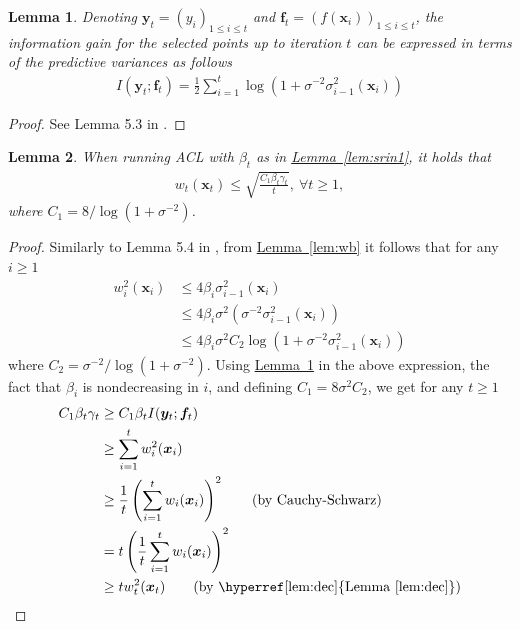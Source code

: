 \documentclass{article}
\def\*#1{\bm{#1}}
\newcommand{\lemmaref}[1]{\hyperref[#1]{\mbox{Lemma~\ref*{#1}}}}
\newtheorem{lemma}{Lemma}
\newcommand{\acl}{\textsf{ACL}\xspace}
\begin{document}
\begin{lemma}
\label{lem:ig}
Denoting $\*y_t = (y_i)_{1\leq i\leq t}$ and
$\*f_t = (f(\*x_i))_{1\leq i\leq t}$,
the information gain for the selected points up to iteration $t$ can be
expressed in terms of the predictive variances as follows
\begin{align*}
I(\*y_t; \*f_t) = \frac{1}{2}\sum_{i=1}^t \log(1 + \sigma^{-2}\sigma_{i-1}^2(\*x_i))
\end{align*}
\end{lemma}
\begin{proof}
See Lemma 5.3 in \cite{srinivas2010}.
\end{proof}

\begin{lemma}
When running \acl with $\beta_t$ as in \lemmaref{lem:srin1}, it holds that
\begin{align*}
w_t(\*x_t) \leq \sqrt{\frac{C_1 \beta_t \gamma_t}{t}},\ \forall t \geq 1,
\end{align*}
where $C_1 = 8 / \log(1 + \sigma^{-2})$.
\end{lemma}
\begin{proof}
Similarly to Lemma 5.4 in \cite{srinivas2010},
from \lemmaref{lem:wb} it follows that for any $i \geq 1$
\begin{align*}
w_i^2(\*x_i) &\leq 4\beta_i\sigma_{i-1}^2(\*x_i)\\
&\leq 4\beta_i\sigma^2(\sigma^{-2}\sigma_{i-1}^2(\*x_i))\\
&\leq 4\beta_i\sigma^2 C_2\log(1 + \sigma^{-2}\sigma_{i-1}^2(\*x_i))
\end{align*}
where $C_2 = \sigma^{-2}/\log(1 + \sigma^{-2})$.
Using \lemmaref{lem:ig} in the above expression, the fact that $\beta_i$
is nondecreasing in $i$, and defining $C_1 = 8\sigma^2C_2$,
we get for any $t \geq 1$
\begin{align*}
C_1\beta_t\gamma_t &\geq C_1\beta_t I(\*y_t; \*f_t)\\
                   &\geq \sum_{i=1}^t w_i^2(\*x_i)\\
                   &\geq \frac{1}{t}\left(\sum_{i=1}^t w_i(\*x_i)\right)^2 \tag*{\textrm{(by Cauchy-Schwarz)}}\\
                   &= t \left(\frac{1}{t}\sum_{i=1}^t w_i(\*x_i)\right)^2\\
                   &\geq t w_t^2(\*x_t) \tag*{\textrm{(by \lemmaref{lem:dec})}}
\end{align*}
\end{proof}
\end{document}
